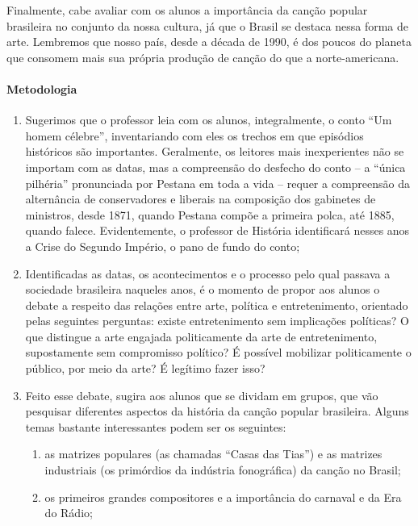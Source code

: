 \documentclass[12pt]{extarticle}
\begin{document}
Finalmente, cabe avaliar com os alunos a importância da canção popular
brasileira no conjunto da nossa cultura, já que o Brasil se destaca
nessa forma de arte. Lembremos que nosso país, desde a década de 1990, é
dos poucos do planeta que consomem mais sua própria produção de canção
do que a norte-americana.

\paragraph{Metodologia}

\begin{enumerate}
\item Sugerimos que o professor leia com os alunos, integralmente, o conto
``Um homem célebre'', inventariando com eles os trechos em que episódios
históricos são importantes. Geralmente, os leitores mais inexperientes
não se importam com as datas, mas a compreensão do desfecho do conto --
a ``única pilhéria'' pronunciada por Pestana em toda a vida -- requer a
compreensão da alternância de conservadores e liberais na composição dos
gabinetes de ministros, desde 1871, quando Pestana compõe a primeira
polca, até 1885, quando falece. Evidentemente, o professor de História
identificará nesses anos a Crise do Segundo Império, o pano de fundo do
conto;

\item Identificadas as datas, os acontecimentos e o processo pelo qual
passava a sociedade brasileira naqueles anos, é o momento de propor aos
alunos o debate a respeito das relações entre arte, política e
entretenimento, orientado pelas seguintes perguntas: existe
entretenimento sem implicações políticas? O que distingue a arte
engajada politicamente da arte de entretenimento, supostamente sem
compromisso político? É possível mobilizar politicamente o público, por
meio da arte? É legítimo fazer isso?

\item Feito esse debate, sugira aos alunos que se dividam em grupos, que
vão pesquisar diferentes aspectos da história da canção popular
brasileira. Alguns temas bastante interessantes podem ser os seguintes:

\begin{enumerate}
\item as matrizes populares (as chamadas ``Casas das Tias'') e as matrizes
industriais (os primórdios da indústria fonográfica) da canção no
Brasil;

\item os primeiros grandes compositores e a importância do carnaval e da
Era do Rádio;


\end{enumerate}
\end{enumerate}
\end{document}

